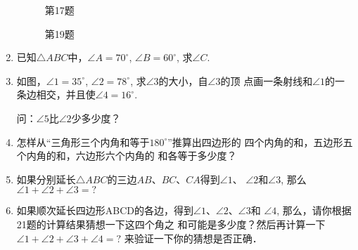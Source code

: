 \begin{enumerate}
\begin{figure}[htp]\centering
    \begin{minipage}[t]{0.48\textwidth}
    \centering
{}
    \caption*{第17题}
    \end{minipage}
    \begin{minipage}[t]{0.48\textwidth}
    \centering
    \caption*{第19题}
    \end{minipage}
    \end{figure}

\item 已知$\triangle ABC$中，$\angle A=70^{\circ}$, $\angle B=60^{\circ}$, 求$\angle C$.
\item 如图，$\angle 1=35^{\circ}$, $\angle 2=78^{\circ}$, 求$\angle 3$的大小，自$\angle 3$的顶
点画一条射线和$\angle 1$的一条边相交，并且使$\angle 4=16^{\circ}$.

问：$\angle 5$比$\angle 2$少多少度？

\item 怎样从“三角形三个内角和等于$180^{\circ}$”推算出四边形的
四个内角的和，五边形五个内角的和，六边形六个内角的
和各等于多少度？
\item 如果分别延长$\triangle ABC$的三边$AB$、$BC$、$CA$得到$\angle 1$、
$\angle 2$和$\angle 3$, 那么$\angle 1+\angle 2+\angle 3=?$
\item 如果顺次延长四边形ABCD的各边，得到$\angle 1$、$\angle 2$、$\angle 3$和
$\angle 4$, 那么，请你根据21题的计算结果猜想一下这四个角之
和可能是多少度？然后再计算一下$\angle 1+\angle 2+\angle 3+\angle 4=?$
来验证一下你的猜想是否正确．


\end{enumerate}
